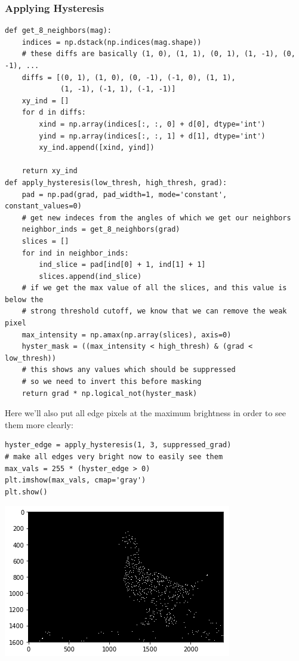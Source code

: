 \documentclass[11pt]{article}
\begin{document}
\subsubsection*{Applying Hysteresis}
\label{sec-5-1-5}
\begin{verbatim}
def get_8_neighbors(mag):
    indices = np.dstack(np.indices(mag.shape))
    # these diffs are basically (1, 0), (1, 1), (0, 1), (1, -1), (0, -1), ...
    diffs = [(0, 1), (1, 0), (0, -1), (-1, 0), (1, 1), 
             (1, -1), (-1, 1), (-1, -1)]
    xy_ind = []
    for d in diffs:
        xind = np.array(indices[:, :, 0] + d[0], dtype='int')
        yind = np.array(indices[:, :, 1] + d[1], dtype='int')
        xy_ind.append([xind, yind])
        
    return xy_ind
def apply_hysteresis(low_thresh, high_thresh, grad): 
    pad = np.pad(grad, pad_width=1, mode='constant', constant_values=0)
    # get new indeces from the angles of which we get our neighbors
    neighbor_inds = get_8_neighbors(grad)
    slices = []
    for ind in neighbor_inds:
        ind_slice = pad[ind[0] + 1, ind[1] + 1]
        slices.append(ind_slice)
    # if we get the max value of all the slices, and this value is below the 
    # strong threshold cutoff, we know that we can remove the weak pixel
    max_intensity = np.amax(np.array(slices), axis=0)
    hyster_mask = ((max_intensity < high_thresh) & (grad < low_thresh))
    # this shows any values which should be suppressed
    # so we need to invert this before masking
    return grad * np.logical_not(hyster_mask)
\end{verbatim}


Here we'll also put all edge pixels at the maximum brightness in order to see
them more clearly:

\begin{verbatim}
hyster_edge = apply_hysteresis(1, 3, suppressed_grad)
# make all edges very bright now to easily see them
max_vals = 255 * (hyster_edge > 0)
plt.imshow(max_vals, cmap='gray')
plt.show()
\end{verbatim}

\includegraphics[width=.9\linewidth]{./obipy-resources/333n5H.png}
\end{document}
